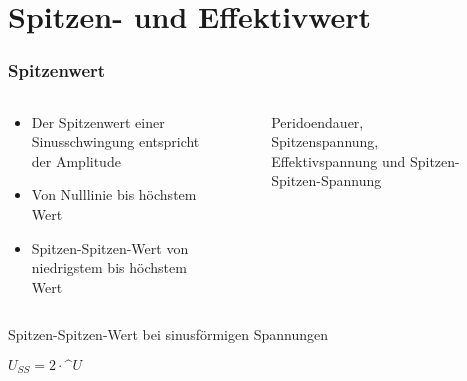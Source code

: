 
\section{Spitzen- und Effektivwert}
\label{section:spitze_effektiv_wert}
\begin{frame}%

\frametitle{Spitzenwert}
\begin{columns}
    \begin{column}{0.48\textwidth}
    \begin{itemize}
  \item Der Spitzenwert einer Sinusschwingung entspricht der Amplitude
  \item Von Nulllinie bis höchstem Wert
  \item Spitzen-Spitzen-Wert von niedrigstem bis höchstem Wert
  \end{itemize}

    \end{column}
   \begin{column}{0.48\textwidth}
       
\begin{figure}
    \caption{\scriptsize Peridoendauer, Spitzenspannung, Effektivspannung und Spitzen-Spitzen-Spannung}
    \label{e_spitze_effektiv_wert_bezeichnungen_sinus}
\end{figure}


   \end{column}
\end{columns}

\end{frame}

\begin{frame}Spitzen-Spitzen-Wert bei sinusförmigen Spannungen

$U_{SS} = 2\cdot \^{U}$

\end{frame}

\begin{frame}
\end{frame}

